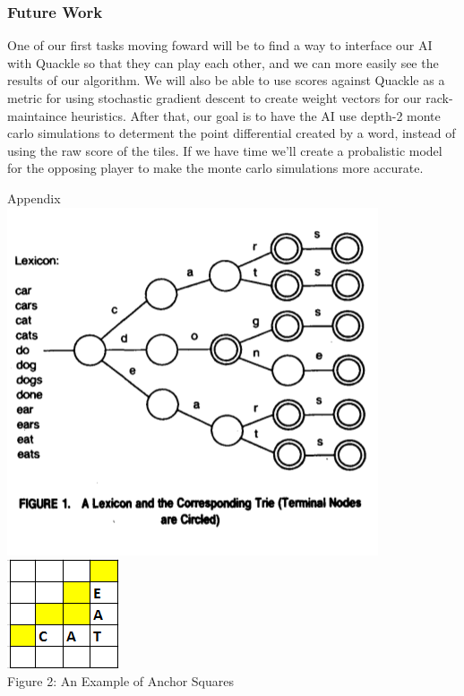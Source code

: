 \documentclass[12pt]{article}
\begin{document}
\subsubsection*{Future Work}
One of our first tasks moving foward will be to find a way to interface our AI with Quackle so that they can play each other, and we can more easily see the results of our algorithm. We will also be able to use scores against Quackle as a metric for using stochastic gradient descent to create weight vectors for our rack-maintaince heuristics. After that, our goal is to have the AI use depth-2 monte carlo simulations to determent the point differential created by a word, instead of using the raw score of the tiles. If we have time we'll create a probalistic model for the opposing player to make the monte carlo simulations more accurate. 
\begin{center}
{\Large Appendix} \\

\includegraphics{trie}\\
\includegraphics{anchorexample}\\
Figure 2: An Example of Anchor Squares
\end{center}
\end{document}
